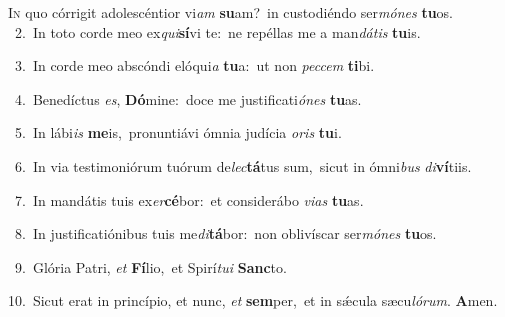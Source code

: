 \lettrine{\initial\textcolor{\initialcolor}{I}}{n} quo córrigit adolescéntior vi\textit{am} \textbf{su}\-am?~\star in custodiéndo ser\-\textit{mó}\-\textit{nes} \textbf{tu}\-os.\\
{\numbfont\textcolor{\numbcolor}{~2.}}~In toto corde meo ex\-\textit{qui}\-\textbf{sí}vi te:~\star ne repéllas me a man\-\textit{dá}\-\textit{tis} \textbf{tu}\-is.\par
{\numbfont\textcolor{\numbcolor}{~3.}}~In corde meo abscóndi elóqui\textit{a} \textbf{tu}\-a:~\star ut non \textit{pec}\-\textit{cem} \textbf{ti}\-bi.\par
{\numbfont\textcolor{\numbcolor}{~4.}}~Benedíctus \textit{es}\-, \textbf{Dó}\-mine:~\star doce me justificati\-\textit{ó}\-\textit{nes} \textbf{tu}\-as.\par
{\numbfont\textcolor{\numbcolor}{~5.}}~In lábi\textit{is} \textbf{me}\-is,~\star pronuntiávi ómnia judícia \textit{o}\-\textit{ris} \textbf{tu}\-i.\par
{\numbfont\textcolor{\numbcolor}{~6.}}~In via testimoniórum tuórum de\-\textit{lec}\-\textbf{tá}tus sum,~\star sicut in ómni\textit{bus} \textit{di}\-\textbf{ví}tiis.\par
{\numbfont\textcolor{\numbcolor}{~7.}}~In mandátis tuis ex\-\textit{er}\-\textbf{cé}bor:~\star et considerábo \textit{vi}\-\textit{as} \textbf{tu}\-as.\par
{\numbfont\textcolor{\numbcolor}{~8.}}~In justificatiónibus tuis me\-\textit{di}\-\textbf{tá}bor:~\star non oblivíscar ser\-\textit{mó}\-\textit{nes} \textbf{tu}\-os.\par
{\numbfont\textcolor{\numbcolor}{~9.}}~Glória Patri, \textit{et} \textbf{Fí}\-lio,~\star et Spirí\-\textit{tu}\-\textit{i} \textbf{Sanc}\-to.\par
{\numbfont\textcolor{\numbcolor}{10.}}~Sicut erat in princípio, et nunc, \textit{et} \textbf{sem}\-per,~\star et in sǽcula sæcu\-\textit{ló}\-\textit{rum}. \textbf{A}\-men.\par
